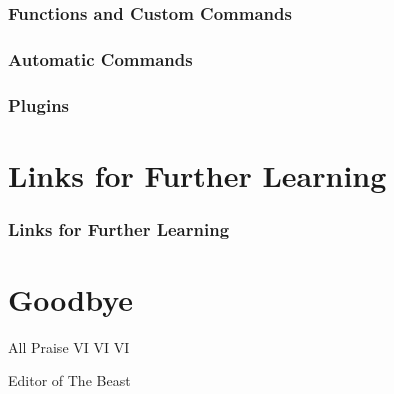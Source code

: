 \documentclass{beamer}
\begin{document}
\begin{frame}
    \frametitle{Functions and Custom Commands}
\end{frame}

\begin{frame}
    \frametitle{Automatic Commands}
\end{frame}

\begin{frame}
    \frametitle{Plugins}
\end{frame}

\section{Links for Further Learning}

\begin{frame}
    \frametitle{Links for Further Learning}
\end{frame}

\section{Goodbye}

\begin{frame}
    \centerline{\huge All Praise VI VI VI}
    \vspace{0.5cm}
    \centerline{\huge Editor of The Beast}
    \begin{figure}
	\centering
	\qquad
    \end{figure}
\end{frame}
\end{document}
